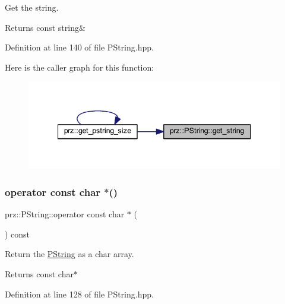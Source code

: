 Get the string. 

\begin{DoxyReturn}{Returns}
const string\& 
\end{DoxyReturn}


Definition at line 140 of file P\+String.\+hpp.

Here is the caller graph for this function\+:
\nopagebreak
\begin{figure}[H]
\begin{center}
\leavevmode
\includegraphics[width=340pt]{classprz_1_1_p_string_aace77edbeea5e61da3a03aa667fa6259_icgraph}
\end{center}
\end{figure}
\mbox{\label{classprz_1_1_p_string_a05c5e08761cab3f57c956130f526dc8b}} 
\subsubsection{\texorpdfstring{operator const char $\ast$()}{operator const char *()}}
{\footnotesize\ttfamily prz\+::\+P\+String\+::operator const char $\ast$ (\begin{DoxyParamCaption}{ }\end{DoxyParamCaption}) const\hspace{0.3cm}{\ttfamily [inline]}}



Return the \mbox{\hyperlink{classprz_1_1_p_string}{P\+String}} as a char array. 

\begin{DoxyReturn}{Returns}
const char$\ast$ 
\end{DoxyReturn}


Definition at line 128 of file P\+String.\+hpp.

\mbox{\label{classprz_1_1_p_string_a4850462b0184e2ed268f709b695b10c3}} 
